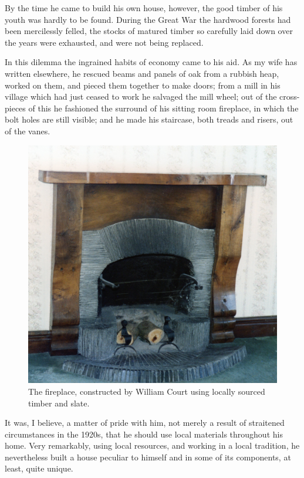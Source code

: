 By the time he came to build his own house, however, the good timber of his youth was hardly to be found. During the Great War the hardwood forests had been mercilessly felled, the stocks of matured timber so carefully laid down over the years were exhausted, and were not being replaced.

In this dilemma the ingrained habits of economy came to his aid. As my wife has written elsewhere, he rescued beams and panels of oak from a rubbish heap, worked on them, and pieced them together to make doors; from a mill in his village which had just ceased to work he salvaged the mill wheel; out of the cross-pieces of this he fashioned the surround of his sitting room fireplace, in which the bolt holes are still visible; and he made his staircase, both treads and risers, out of the vanes.

\begin{figure}
	\centering
     \includegraphics[width=1\textwidth]{figures/Fireplace}
     \caption{The fireplace, constructed by William Court using locally sourced timber and slate.}
     \label{fig:Fireplace}
\end{figure}

It was, I believe, a matter of pride with him, not merely a result of straitened circumstances in the 1920s, that he should use local materials throughout his home. Very remarkably, using local resources, and working in a local tradition, he nevertheless built a house peculiar to himself and in some of its components, at least, quite unique.


